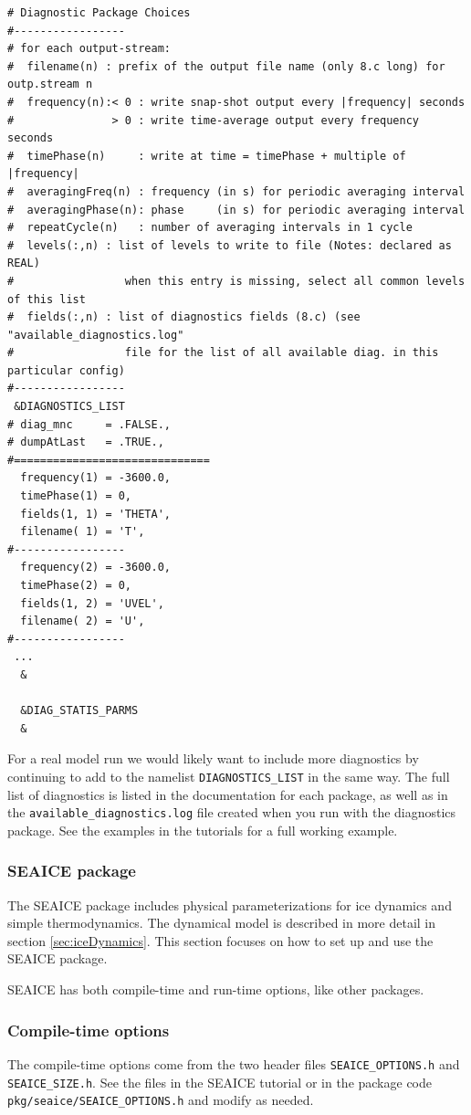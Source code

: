 \documentclass[11pt]{article}
\begin{document}
\begin{lstlisting}[caption={Example \texttt{data.diagnostics} file}, captionpos=b]
# Diagnostic Package Choices
#-----------------
# for each output-stream:
#  filename(n) : prefix of the output file name (only 8.c long) for outp.stream n
#  frequency(n):< 0 : write snap-shot output every |frequency| seconds
#               > 0 : write time-average output every frequency seconds
#  timePhase(n)     : write at time = timePhase + multiple of |frequency|
#  averagingFreq(n) : frequency (in s) for periodic averaging interval
#  averagingPhase(n): phase     (in s) for periodic averaging interval
#  repeatCycle(n)   : number of averaging intervals in 1 cycle
#  levels(:,n) : list of levels to write to file (Notes: declared as REAL)
#                 when this entry is missing, select all common levels of this list
#  fields(:,n) : list of diagnostics fields (8.c) (see "available_diagnostics.log"
#                 file for the list of all available diag. in this particular config)
#-----------------
 &DIAGNOSTICS_LIST
# diag_mnc     = .FALSE.,
# dumpAtLast   = .TRUE.,
#==============================
  frequency(1) = -3600.0,
  timePhase(1) = 0,
  fields(1, 1) = 'THETA',
  filename( 1) = 'T',
#-----------------
  frequency(2) = -3600.0,
  timePhase(2) = 0,
  fields(1, 2) = 'UVEL',
  filename( 2) = 'U',
#-----------------
 ...
  &

  &DIAG_STATIS_PARMS
  &
\end{lstlisting}
For a real model run we would likely want to include more diagnostics by continuing to add to the namelist \verb|DIAGNOSTICS_LIST| in the same way. The full list of diagnostics is listed in the documentation for each package, as well as in the \verb|available_diagnostics.log| file created when you run with the diagnostics package. See the examples in the tutorials for a full working example.

\subsubsection{SEAICE package}
\label{sec:SEAICE}
The SEAICE package includes physical parameterizations for ice dynamics and simple thermodynamics. The dynamical model is described in more detail in section \ref{sec:iceDynamics}. This section focuses on how to set up and use the SEAICE package.

SEAICE has both compile-time and run-time options, like other packages.

\subsubsection*{Compile-time options}
The compile-time options come from the two header files \verb|SEAICE_OPTIONS.h| and \verb|SEAICE_SIZE.h|. See the files in the SEAICE tutorial or in the package code \verb|pkg/seaice/SEAICE_OPTIONS.h| and modify as needed.
\end{document}
